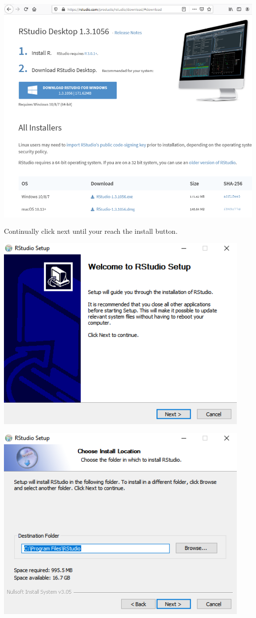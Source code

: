 \documentclass[
]{book}
\begin{document}
\includegraphics{images/05-rstudio_1.png}

Continually click next until your reach the install button.

\includegraphics{images/05-rstudio_2.png}

\includegraphics{images/05-rstudio_3.png}
\end{document}
